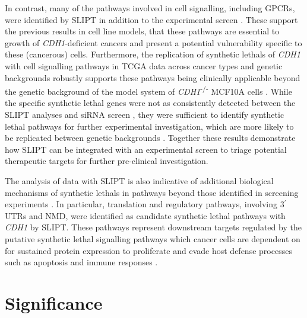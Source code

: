 In contrast, many of the pathways involved in cell signalling, including \glspl{GPCR}, were identified by \gls{SLIPT} in addition to the experimental screen \citep{Telford2015}. These support the previous results in cell line models, that these pathways are \gls{essential} to growth of \textit{CDH1}-deficient cancers and present a potential vulnerability specific to these (cancerous) cells. Furthermore, the replication of \glspl{synthetic lethal} of \textit{CDH1} with cell signalling pathways in \gls{TCGA} data across cancer types and genetic backgrounds robustly supports these pathways being clinically applicable beyond the genetic background of the model system of \textit{CDH1}\textsuperscript{-/-} \gls{MCF10A} cells \citep{Chen2014}. While the specific \gls{synthetic lethal} genes were not as consistently detected between the \gls{SLIPT} analyses and \gls{siRNA} screen \citep{Telford2015}, they were sufficient to identify \gls{synthetic lethal} pathways for further experimental investigation, which are more likely to be replicated between genetic backgrounds \citep{Dixon2008}. Together these results demonstrate how \gls{SLIPT} can be integrated with an experimental screen to triage potential therapeutic targets  for further pre-clinical investigation.

The analysis of  data with \gls{SLIPT} is also indicative of additional biological mechanisms of \glspl{synthetic lethal} in pathways beyond those identified in screening experiments \citep{Telford2015}. In particular, translation and regulatory pathways, involving 3$^\prime$ \glspl{UTR} and \gls{NMD}, were identified as candidate \gls{synthetic lethal} pathways with \textit{CDH1} by \gls{SLIPT}. These pathways represent downstream targets regulated by the putative \gls{synthetic lethal} signalling pathways which cancer cells are dependent on for sustained protein expression to proliferate and evade host defense processes such as apoptosis and immune responses \citep{Gao2015} . 



\section{Significance}
\label{chapt6:significance}

